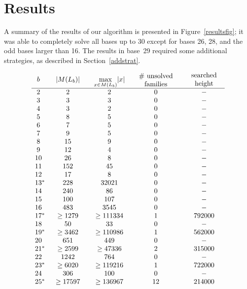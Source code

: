 \documentclass[12pt]{article}
\theoremstyle{plain}
\theoremstyle{definition}
\newcommand{\0}{\mathtt{0}}
\newcommand{\1}{\mathtt{1}}
\newcommand{\2}{\mathtt{2}}
\newcommand{\3}{\mathtt{3}}
\newcommand{\4}{\mathtt{4}}
\newcommand{\5}{\mathtt{5}}
\newcommand{\6}{\mathtt{6}}
\newcommand{\7}{\mathtt{7}}
\newcommand{\8}{\mathtt{8}}
\newcommand{\9}{\mathtt{9}}
\begin{document}
\section{Results}
A summary of the results of our algorithm is presented in 
Figure~\ref{resultsfig}; it was able to completely solve all bases up to 30 except for
bases 26, 28, and the odd bases larger than 16.
The results in base~29 required some additional strategies, as described in Section~\ref{addstrat}.

\begin{figure}\[\begin{array}{c@{\qquad}c@{\qquad}c@{\qquad}c@{\qquad}c}
b & \lvert M(L_b)\rvert & \max\limits_{x\in M(L_b)}\lvert x\rvert & \parbox{5em}{\centering\# unsolved\\families} & \parbox{5em}{\centering searched height} \\ \hline
2 & 2 & 2 & 0 & - \\ 
3 & 3 & 3 & 0 & - \\ 
4 & 3 & 2 & 0 & - \\ 
5 & 8 & 5 & 0 & - \\ 
6 & 7 & 5 & 0 & - \\ 
7 & 9 & 5 & 0 & - \\ 
8 & 15 & 9 & 0 & - \\ 
9 & 12 & 4 & 0 & - \\ 
10 & 26 & 8 & 0 & - \\ 
11 & 152 & 45 & 0 & - \\ 
12 & 17 & 8 & 0 & - \\ 
13\mathrlap{^*} & 228 & 32021 & 0 & - \\ 
14 & 240 & 86 & 0 & - \\ 
15 & 100 & 107 & 0 & - \\ 
16 & 483 & 3545 & 0 & - \\ 
17\mathrlap{^*} & \geq1279 & \geq111334 & 1 & 792000 \\ 
18 & 50 & 33 & 0 & - \\ 
19\mathrlap{^*} & \geq3462 & \geq110986 & 1 & 562000 \\ 
20 & 651 & 449 & 0 & - \\ 
21\mathrlap{^*} & \geq2599 & \geq47336 & 2 & 315000 \\ 
22 & 1242 & 764 & 0 & - \\ 
23\mathrlap{^*} & \geq6020 & \geq119216 & 1 & 722000 \\ 
24 & 306 & 100 & 0 & - \\ 
25\mathrlap{^*} & \geq17597 & \geq136967 & 12 & 214000 \\ 

\end{array}\]
\end{figure}
\end{document}
